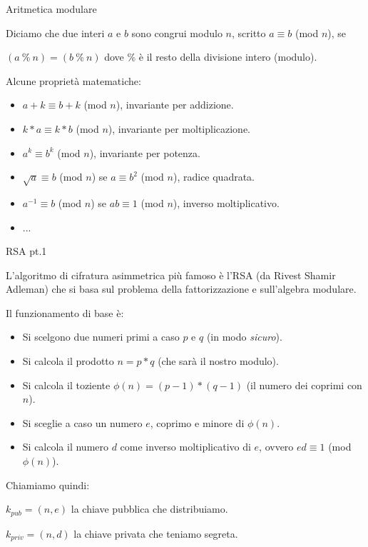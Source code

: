\documentclass[xcolor=dvipsnames,aspectratio=169]{beamer}
\begin{document}
\begin{frame}{Aritmetica modulare}

Diciamo che due interi $a$ e $b$ sono congrui modulo $n$, scritto $a \equiv b$ (mod $n$), se

$(a\ \%\ n) = (b\ \%\ n)$ dove \% è il resto della divisione intero (modulo).

\medskip

\pause

Alcune proprietà matematiche:

\pause

\begin{itemize}
  \item $a + k\equiv b + k$ (mod $n$), invariante per addizione.
  \item $k*a \equiv k*b$ (mod $n$), invariante per moltiplicazione.
  \item $a^k \equiv b^k$ (mod $n$), invariante per potenza.\pause
  \item $\sqrt{a} \equiv b$ (mod $n$) se $a \equiv b^2$ (mod $n$), radice quadrata.
  \item $a^{-1} \equiv b$ (mod $n$) se $ab \equiv 1$ (mod $n$), inverso moltiplicativo.
  \item ...
\end{itemize}

\end{frame}

\begin{frame}{RSA pt.1}

\pause

L'algoritmo di cifratura asimmetrica più famoso è l'RSA (da {\color{red}R}ivest {\color{red}S}hamir {\color{red}A}dleman) che si basa sul problema della fattorizzazione e sull'algebra modulare.

\pause

\smallskip

Il funzionamento di base è:\pause

\begin{itemize}
  \item Si scelgono due numeri primi a caso $p$ e $q$ (in modo \textit{sicuro}).\pause
  \item Si calcola il prodotto $n = p*q$ (che sarà il nostro modulo).\pause
  \item Si calcola il toziente $\phi(n) = (p-1)*(q-1)$ (il numero dei coprimi con $n$).\pause
  \item Si sceglie a caso un numero $e$, coprimo e minore di $\phi(n)$.\pause
  \item Si calcola il numero $d$ come inverso moltiplicativo di $e$, ovvero $ed \equiv 1$ (mod $\phi(n)$).
\end{itemize}

\medskip

\pause

Chiamiamo quindi:

\pause

$k_{pub} = (n, e)$ la chiave pubblica che distribuiamo.

\pause

$k_{priv} = (n, d)$ la chiave privata che teniamo segreta.

\end{frame}
\end{document}
